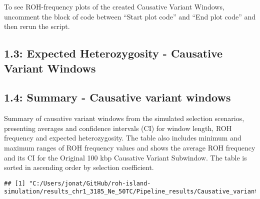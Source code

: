 \documentclass[
]{article}
\begin{document}
To see ROH-frequency plots of the created Causative Variant Windows,
uncomment the block of code between ``Start plot code'' and ``End plot
code'' and then rerun the script.

\subsection{1.3: Expected Heterozygosity - Causative Variant
Windows}\label{expected-heterozygosity---causative-variant-windows}

\subsection{1.4: Summary - Causative variant
windows}\label{summary---causative-variant-windows}

Summary of causative variant windows from the simulated selection
scenarios, presenting averages and confidence intervals (CI) for window
length, ROH frequency and expected heterozygosity. The table also
includes minimum and maximum ranges of ROH frequency values and shows
the average ROH frequency and its CI for the Original 100 kbp Causative
Variant Subwindow. The table is sorted in ascending order by selection
coefficient.

\begin{verbatim}
## [1] "C:/Users/jonat/GitHub/roh-island-simulation/results_chr1_3185_Ne_50TC/Pipeline_results/Causative_variant_windows_summary.txt"
\end{verbatim}
\end{document}
